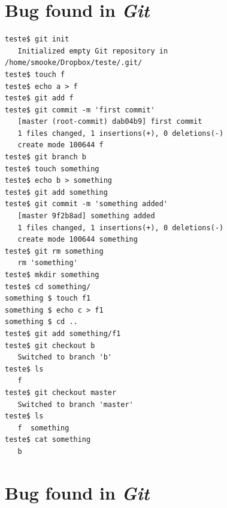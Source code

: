 \chapter{Bug found in \emph{Git}}
\label{bugappend}
\begin{lstlisting}
teste$ git init
   Initialized empty Git repository in /home/smooke/Dropbox/teste/.git/
teste$ touch f
teste$ echo a > f
teste$ git add f
teste$ git commit -m 'first commit'
   [master (root-commit) dab04b9] first commit
   1 files changed, 1 insertions(+), 0 deletions(-)
   create mode 100644 f
teste$ git branch b
teste$ touch something
teste$ echo b > something
teste$ git add something
teste$ git commit -m 'something added'
   [master 9f2b8ad] something added
   1 files changed, 1 insertions(+), 0 deletions(-)
   create mode 100644 something
teste$ git rm something
   rm 'something'
teste$ mkdir something
teste$ cd something/
something $ touch f1
something $ echo c > f1
something $ cd ..
teste$ git add something/f1
teste$ git checkout b
   Switched to branch 'b'
teste$ ls
   f
teste$ git checkout master
   Switched to branch 'master'
teste$ ls
   f  something
teste$ cat something
   b
\end{lstlisting}

\chapter{Bug found in \emph{Git}}
\label{bugappend2}

